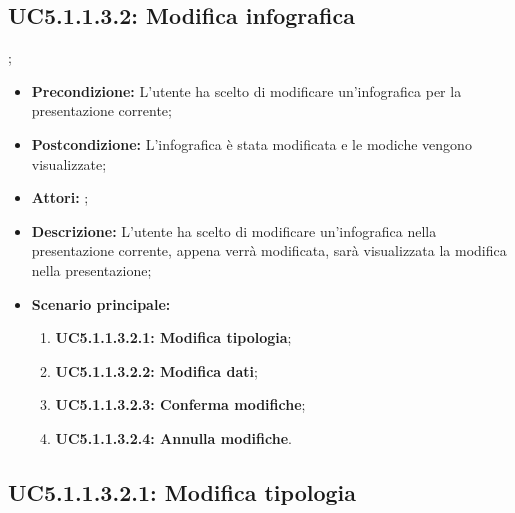 \subsection{ UC5.1.1.3.2: Modifica infografica}
;
\begin{itemize}
	\item \textbf{Precondizione:} L'utente ha scelto di modificare un'infografica per la presentazione corrente;
	\item \textbf{Postcondizione:} L'infografica è stata modificata e le modiche vengono visualizzate;
	\item \textbf{Attori:} ;
	\item \textbf{Descrizione:} L'utente ha scelto di modificare un'infografica nella presentazione corrente, appena verrà modificata, sarà visualizzata la modifica nella presentazione;
	\item \textbf{Scenario principale:}
	\begin{enumerate}
		\item \textbf{ UC5.1.1.3.2.1: Modifica tipologia};
		\item \textbf{ UC5.1.1.3.2.2: Modifica dati};
		\item \textbf{ UC5.1.1.3.2.3: Conferma modifiche};
		\item \textbf{ UC5.1.1.3.2.4: Annulla modifiche}.
	\end{enumerate}
\end{itemize}
\subsection{ UC5.1.1.3.2.1: Modifica tipologia}

